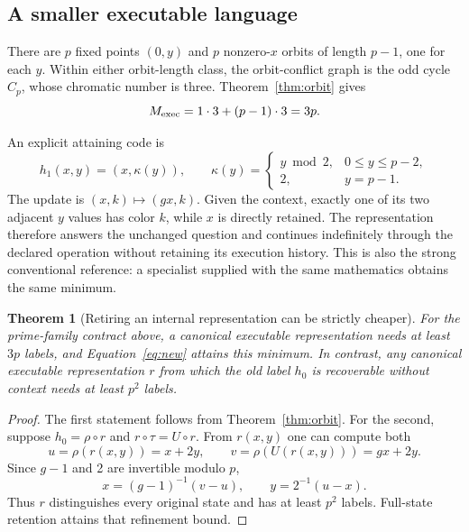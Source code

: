 \documentclass[11pt,letterpaper]{article}
\newtheorem{theorem}{Theorem}[section]
\theoremstyle{remark}\newtheorem{remark}{Remark}[section]
\begin{document}
\subsection{A smaller executable language}
There are $p$ fixed points $(0,y)$ and $p$ nonzero-$x$ orbits of length $p-1$, one for each $y$. Within either orbit-length class, the orbit-conflict graph is the odd cycle $C_p$, whose chromatic number is three. Theorem~\ref{thm:orbit} gives
\begin{equation}
 M_{\rm exec}=1\cdot3+(p-1)\cdot3=3p.\label{eq:3p}
\end{equation}

An explicit attaining code is
\begin{equation}
 h_1(x,y)=(x,\kappa(y)),\qquad
 \kappa(y)=\begin{cases}y\bmod2,&0\le y\le p-2,\\2,&y=p-1.\end{cases}\label{eq:new}
\end{equation}
The update is $(x,k)\mapsto(gx,k)$. Given the context, exactly one of its two adjacent $y$ values has color $k$, while $x$ is directly retained. The representation therefore answers the unchanged question and continues indefinitely through the declared operation without retaining its execution history. This is also the strong conventional reference: a specialist supplied with the same mathematics obtains the same minimum.

\begin{theorem}[Retiring an internal representation can be strictly cheaper]\label{thm:retire}
For the prime-family contract above, a canonical executable representation needs at least $3p$ labels, and Equation~\eqref{eq:new} attains this minimum. In contrast, any canonical executable representation $r$ from which the old label $h_0$ is recoverable without context needs at least $p^2$ labels.
\end{theorem}
\begin{proof}
The first statement follows from Theorem~\ref{thm:orbit}. For the second, suppose $h_0=\rho\circ r$ and $r\circ\tau=U\circ r$. From $r(x,y)$ one can compute both
\begin{equation}
 u=\rho(r(x,y))=x+2y,\qquad
 v=\rho(U(r(x,y)))=gx+2y.
\end{equation}
Since $g-1$ and 2 are invertible modulo $p$,
\begin{equation}
 x=(g-1)^{-1}(v-u),\qquad y=2^{-1}(u-x).\label{eq:recover}
\end{equation}
Thus $r$ distinguishes every original state and has at least $p^2$ labels. Full-state retention attains that refinement bound.
\end{proof}
\end{document}
